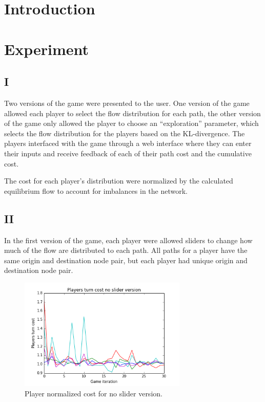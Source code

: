 \documentclass{sig-alternate-ipsn13}
\begin{document}
\section{Introduction}



\section{Experiment}

\subsection{I}

Two versions of the game were presented to the user. One version of the game allowed each player to select the flow distribution for each path, the other version of the game only allowed the player to choose an ``exploration'' parameter, which selects the flow distribution for the players based on the KL-divergence.
The players interfaced with the game through a web interface where they can enter their inputs and receive feedback of each of their path cost and the cumulative cost.


The cost for each player's distribution were normalized by the calculated equilibrium flow to account for imbalances in the network.


\subsection{II}
In the first version of the game, each player were allowed sliders to change how much of the flow are distributed to each path. All paths for a player have the same origin and destination node pair, but each player had unique origin and destination node pair.

\begin{figure}
  \centering
  \includegraphics[width=80mm]{images/no_slider_players_costs}
  \caption{Player normalized cost for no slider version.}
  \label{fig:cost_no_slider}
\end{figure}
\end{document}
